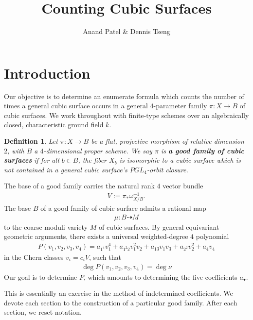 \documentclass{article}
\title{Counting Cubic Surfaces}
\author{Anand Patel \& Dennis Tseng}
\newtheorem{definition}{Definition}[section]
\newcommand{\<}{\left\langle}
\renewcommand{\>}{\right\rangle}
\begin{document}
\maketitle


\section{Introduction}
\label{sec:intro}
Our objective is to determine an enumerate formula which counts the
number of times a general cubic surface occurs in a general
$4$-parameter family $ \pi: X \to B$ of cubic surfaces.  We work
throughout with finite-type schemes over an algebraically closed,
characteristic ground field $k$.

\begin{definition}
  Let $\pi :X \to B$ be a flat, projective morphism of relative
  dimension $2$, with $B$ a $4$-dimensional proper scheme. We say
  $\pi$ is {\bf a good family of cubic surfaces} if for all $b \in B$,
  the fiber $X_{b}$ is isomorphic to a cubic surface which is not
  contained in a general cubic surface's $PGL_4$-orbit closure.
\end{definition}

The base of a good family carries the natural rank $4$
vector bundle
\begin{align}
  \label{eq:V}
  V := \pi_{*}\omega_{X/B}^{-1}.
\end{align}
The base $B$ of a good family of cubic surface admits a rational map
\begin{align}
  \label{eq:mu}
  \mu: B \dashrightarrow M
\end{align}
to the coarse moduli variety $M$ of cubic surfaces.  By general
equivariant-geometric arguments, there exists a universal
weighted-degree $4$ polynomial
\begin{align}
  \label{eq:P}
  P(v_1,v_2,v_3,v_4) = a_{1^4}v_{1}^{4} + a_{1^{2}2}v_{1}^{2}v_{2} + a_{13}v_{1}v_{3} + a_{2^2}v_{2}^{2} + a_{4}v_{4}
\end{align}
in the Chern classes $v_{i} = c_{i}V$, such that
\begin{align}
  \label{eq:equality}
  \deg P(v_{1},v_{2},v_{3},v_{4}) = \deg \nu
  \end{align}
Our goal is to determine $P$, which amounts to determining
the five coefficients $a_{\bullet}$.

This is essentially an exercise in the method of indetermined
coefficients. We devote each section to the construction of a
particular good family.  After each section, we reset notation.
\end{document}
